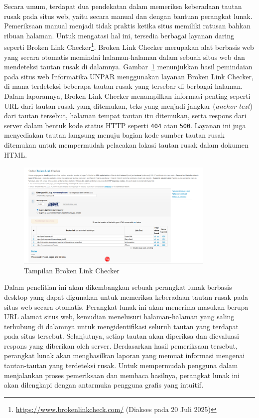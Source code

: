 Secara umum, terdapat dua pendekatan dalam memeriksa keberadaan tautan rusak pada situs web, yaitu secara manual dan dengan bantuan perangkat lunak. Pemeriksaan manual menjadi tidak praktis ketika situs memiliki ratusan bahkan ribuan halaman. Untuk mengatasi hal ini, tersedia berbagai layanan daring seperti Broken Link Checker\footnote{\url{https://www.brokenlinkcheck.com/} (Diakses pada 20 Juli 2025)}. Broken Link Checker merupakan alat berbasis web yang secara otomatis memindai halaman-halaman dalam sebuah situs web dan mendeteksi tautan rusak di dalamnya. Gambar~\ref{fig:gambar-contoh-brokenlinkcheck} menunjukkan hasil pemindaian pada situs web Informatika UNPAR menggunakan layanan Broken Link Checker, di mana terdeteksi beberapa tautan rusak yang tersebar di berbagai halaman. Dalam laporannya, Broken Link Checker menampilkan informasi penting seperti URL dari tautan rusak yang ditemukan, teks yang menjadi jangkar (\textit{anchor text}) dari tautan tersebut, halaman tempat tautan itu ditemukan, serta respons dari server dalam bentuk kode status HTTP seperti \texttt{404} atau \texttt{500}. Layanan ini juga menyediakan tautan langsung menuju bagian kode sumber tautan rusak ditemukan untuk mempermudah pelacakan lokasi tautan rusak dalam dokumen HTML.

\begin{figure}[H]
    \centering
    \includegraphics[width=0.85\textwidth]{Gambar/010100-broken-link-checker.png}
    \caption{Tampilan Broken Link Checker}
    \label{fig:gambar-contoh-brokenlinkcheck}
\end{figure}


Dalam penelitian ini akan dikembangkan sebuah perangkat lunak berbasis desktop yang dapat digunakan untuk memeriksa keberadaan tautan rusak pada situs web secara otomatis. Perangkat lunak ini akan menerima masukan berupa URL alamat situs web, kemudian menelusuri halaman-halaman yang saling terhubung di dalamnya untuk mengidentifikasi seluruh tautan yang terdapat pada situs tersebut. Selanjutnya, setiap tautan akan diperiksa dan dievaluasi respons yang diberikan oleh server. Berdasarkan hasil pemeriksaan tersebut, perangkat lunak akan menghasilkan laporan yang memuat informasi mengenai tautan-tautan yang terdeteksi rusak. Untuk mempermudah pengguna dalam menjalankan proses pemeriksaan dan membaca hasilnya, perangkat lunak ini akan dilengkapi dengan antarmuka pengguna grafis yang intuitif.